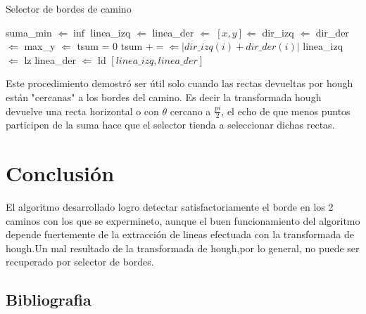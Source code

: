 \documentclass[a4paper,spanish]{article}
\begin{document}
\begin{algorithm}[H]
\caption{Selector de bordes de camino}
\label{alg:selector}
\begin{algorithmic}


	\State suma\_min $ \Leftarrow \inf$
    \State linea\_izq $ \Leftarrow $ \Null
    \State linea\_der $ \Leftarrow $ \Null
        			\State $[x,y] \Leftarrow $ 
                    \State dir\_izq $\Leftarrow$ 
                    \State dir\_der $\Leftarrow$ 
                    \State max\_y $ \Leftarrow $ 
                    \State tsum = 0
                    	\State tsum $+= \Leftarrow |dir\_izq(i) + dir\_der(i)|$  
                    \EndFor
                        \State linea\_izq $ \Leftarrow $ lz
                        \State linea\_der $ \Leftarrow $ ld                   
                    \EndIf               
            \EndFor
        \EndFor
     \State \Return $[linea\_izq,linea\_der]$
\EndProcedure
\end{algorithmic}
\end{algorithm}


    Este procedimiento demostró ser útil solo cuando las rectas devueltas por hough están "cercanas" a los bordes del camino. Es decir la transformada hough devuelve una recta horizontal o con $\theta$ cercano a $\frac{pi}{2}$, el echo de que menos puntos participen de la suma hace que el selector tienda a seleccionar dichas rectas. 


\section{Conclusión}

El algoritmo desarrollado logro detectar satisfactoriamente el borde en los 2 caminos con los que se expermineto, aunque el buen funcionamiento del algoritmo depende fuertemente de la extracción de lineas efectuada con la transformada de hough.Un mal resultado de la transformada de hough,por lo general, no puede ser recuperado por selector de bordes. 


\subsection{Bibliografia}
\end{document}
